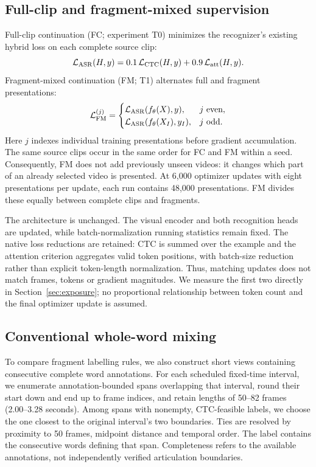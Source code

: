 \subsection{Full-clip and fragment-mixed supervision}
Full-clip continuation (FC; experiment T0) minimizes the recognizer's existing
hybrid loss on each complete source clip:
\begin{equation}
 \mathcal L_{\rm ASR}(H,y)
 = 0.1\,\mathcal L_{\mathrm{CTC}}(H,y)
   +0.9\,\mathcal L_{\mathrm{att}}(H,y).
 \label{eq:asr}
\end{equation}
Fragment-mixed continuation (FM; T1) alternates full and fragment presentations:
\begin{equation}
 \mathcal L_{\rm FM}^{(j)} =
 \begin{cases}
  \mathcal L_{\rm ASR}(f_\theta(X),y), & j\text{ even},\\
  \mathcal L_{\rm ASR}(f_\theta(X_I),y_I), & j\text{ odd}.
 \end{cases}
 \label{eq:mix}
\end{equation}
Here $j$ indexes individual training presentations before gradient accumulation.
The same source clips occur in the same order for FC and FM within a seed.
Consequently, FM does not add previously unseen videos: it changes which part of
an already selected video is presented. At 6,000 optimizer updates with eight
presentations per update, each run contains 48,000 presentations. FM divides these
equally between complete clips and fragments.

The architecture is unchanged. The visual encoder and both recognition heads are
updated, while batch-normalization running statistics remain fixed. The native
loss reductions are retained: CTC is summed over the example and the attention
criterion aggregates valid token positions, with batch-size reduction rather than
explicit token-length normalization. Thus, matching updates does not match frames,
tokens or gradient magnitudes. We measure the first two directly in
Section~\ref{sec:exposure}; no proportional relationship between token count and
the final optimizer update is assumed.



\subsection{Conventional whole-word mixing}
\label{sec:wordviews}
To compare fragment labelling rules, we also construct short views containing
consecutive complete word annotations. For each scheduled fixed-time interval,
we enumerate annotation-bounded spans overlapping that interval, round their
start down and end up to frame indices, and retain lengths of 50--82 frames
(2.00--3.28 seconds). Among spans with nonempty, CTC-feasible labels, we choose
the one closest to the original interval's two boundaries. Ties are resolved
by proximity to 50 frames, midpoint distance and temporal order. The label
contains the consecutive words defining that span. Completeness refers to the
available annotations, not independently verified articulation boundaries.

